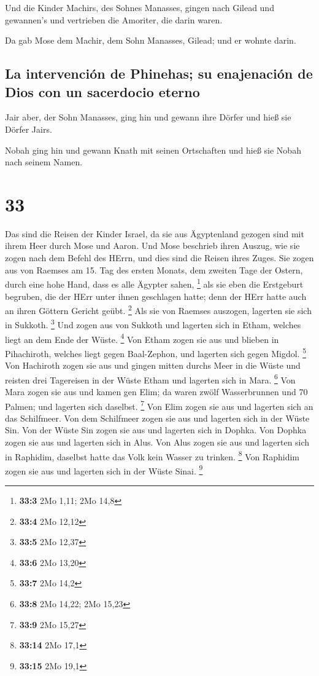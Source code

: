  Und die Kinder Machirs, des Sohnes Manasses, gingen nach
Gilead und gewannen's und vertrieben die Amoriter, die darin waren.

 Da gab Mose dem Machir, dem Sohn Manasses, Gilead; und
er wohnte darin.

\hypertarget{la-intervenciuxf3n-de-phinehas-su-enajenaciuxf3n-de-dios-con-un-sacerdocio-eterno}{%
\subsection{La intervención de Phinehas; su enajenación de Dios con un
sacerdocio
eterno}\label{la-intervenciuxf3n-de-phinehas-su-enajenaciuxf3n-de-dios-con-un-sacerdocio-eterno}}

 Jair aber, der Sohn Manasses, ging hin und gewann ihre
Dörfer und hieß sie Dörfer Jairs.

 Nobah ging hin und gewann Knath mit seinen Ortschaften
und hieß sie Nobah nach seinem Namen.

\hypertarget{section-32}{%
\section{33}\label{section-32}}

 Das sind die Reisen der Kinder Israel, da sie aus
Ägyptenland gezogen sind mit ihrem Heer durch Mose und Aaron.
 Und Mose beschrieb ihren Auszug, wie sie zogen nach dem
Befehl des HErrn, und dies sind die Reisen ihres Zuges. 
Sie zogen aus von Raemses am 15. Tag des ersten Monats, dem zweiten Tage
der Ostern, durch eine hohe Hand, dass es alle Ägypter sahen,
\footnote{\textbf{33:3} 2Mo 1,11; 2Mo 14,8}  als sie eben
die Erstgeburt begruben, die der HErr unter ihnen geschlagen hatte; denn
der HErr hatte auch an ihren Göttern Gericht geübt. \footnote{\textbf{33:4}
  2Mo 12,12}  Als sie von Raemses auszogen, lagerten sie
sich in Sukkoth. \footnote{\textbf{33:5} 2Mo 12,37}  Und
zogen aus von Sukkoth und lagerten sich in Etham, welches liegt an dem
Ende der Wüste. \footnote{\textbf{33:6} 2Mo 13,20}  Von
Etham zogen sie aus und blieben in Pihachiroth, welches liegt gegen
Baal-Zephon, und lagerten sich gegen Migdol. \footnote{\textbf{33:7} 2Mo
  14,2}  Von Hachiroth zogen sie aus und gingen mitten
durchs Meer in die Wüste und reisten drei Tagereisen in der Wüste Etham
und lagerten sich in Mara. \footnote{\textbf{33:8} 2Mo 14,22; 2Mo 15,23}
 Von Mara zogen sie aus und kamen gen Elim; da waren zwölf
Wasserbrunnen und 70 Palmen; und lagerten sich daselbst. \footnote{\textbf{33:9}
  2Mo 15,27}  Von Elim zogen sie aus und lagerten sich an
das Schilfmeer.  Von dem Schilfmeer zogen sie aus und
lagerten sich in der Wüste Sin.  Von der Wüste Sin zogen
sie aus und lagerten sich in Dophka.  Von Dophka zogen
sie aus und lagerten sich in Alus.  Von Alus zogen sie
aus und lagerten sich in Raphidim, daselbst hatte das Volk kein Wasser
zu trinken. \footnote{\textbf{33:14} 2Mo 17,1}  Von
Raphidim zogen sie aus und lagerten sich in der Wüste Sinai. \footnote{\textbf{33:15}
  2Mo 19,1}

